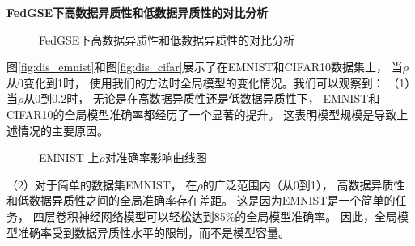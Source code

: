 \textbf{FedGSE下高数据异质性和低数据异质性的对比分析 }
\begin{figure}[thbp]
    \centering
    \hfill
    \hfill
    \caption{FedGSE下高数据异质性和低数据异质性的对比分析}
    \label{fig:dis_all}
\end{figure}
图\ref{fig:dis_emnist}和图\ref{fig:dis_cifar}展示了在EMNIST和CIFAR10数据集上，
当$\rho$从0变化到1时，
使用我们的方法时全局模型的变化情况。我们可以观察到：
（1）当$\rho$从0到0.2时，
无论是在高数据异质性还是低数据异质性下，
EMNIST和CIFAR10的全局模型准确率都经历了一个显著的提升。
这表明模型规模是导致上述情况的主要原因。
\begin{figure}[thbp]
    \centering
    \hfill
    \hfill
    \caption{ EMNIST 上$\rho$对准确率影响曲线图}
    \label{fig:motivation_distribution_emnist}
\end{figure}
（2）对于简单的数据集EMNIST，
在$\rho$的广泛范围内（从0到1），
高数据异质性和低数据异质性之间的全局准确率存在差距。
这是因为EMNIST是一个简单的任务，
四层卷积神经网络模型可以轻松达到85\%的全局模型准确率。
因此，全局模型准确率受到数据异质性水平的限制，而不是模型容量。
